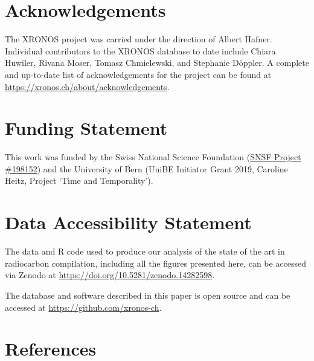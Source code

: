 \documentclass[
  number,
  preprint]{elsarticle}
\begin{document}
\section{Acknowledgements}\label{acknowledgements}

The XRONOS project was carried under the direction of Albert Hafner.
Individual contributors to the XRONOS database to date include Chiara
Huwiler, Rivana Moser, Tomasz Chmielewski, and Stephanie Döppler. A
complete and up-to-date list of acknowledgements for the project can be
found at \url{https://xronos.ch/about/acknowledgements}.

\section{Funding Statement}\label{funding-statement}

This work was funded by the Swiss National Science Foundation
(\href{https://data.snf.ch/grants/grant/198153}{SNSF Project \#198152})
and the University of Bern (UniBE Initiator Grant 2019, Caroline Heitz,
Project `Time and Temporality').

\section{Data Accessibility
Statement}\label{data-accessibility-statement}

The data and R code used to produce our analysis of the state of the art
in radiocarbon compilation, including all the figures presented here,
can be accessed via Zenodo at
\url{https://doi.org/10.5281/zenodo.14282598}.

The database and software described in this paper is open source and can
be accessed at \url{https://github.com/xronos-ch}.

\section*{References}\label{references}
\end{document}
